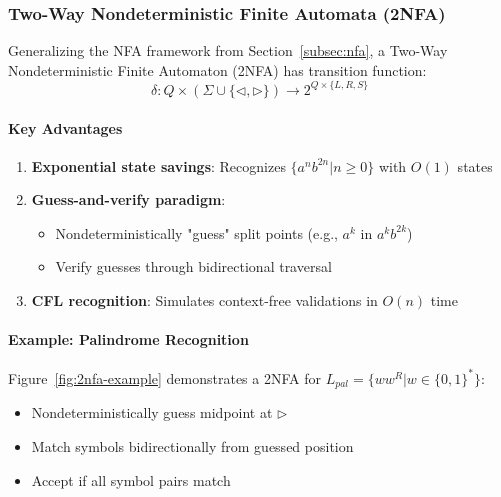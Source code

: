 \subsubsection{Two-Way Nondeterministic Finite Automata (2NFA)}
\label{subsubsec:2nfa}

Generalizing the NFA framework from Section~\ref{subsec:nfa}, a Two-Way Nondeterministic Finite Automaton (2NFA) \cite{hopcroft2006introduction} has transition function:
\[
\delta: Q \times (\Sigma \cup \{\triangleleft, \triangleright\}) \rightarrow 2^{Q \times \{L, R, S\}}
\]

\paragraph{Key Advantages}
\begin{enumerate}
    \item \textbf{Exponential state savings}: Recognizes \( \{a^n b^{2n} | n \geq 0\} \) with \( O(1) \) states \cite{yakaryilmaz2010succinctness}
    \item \textbf{Guess-and-verify paradigm}: 
        \begin{itemize}
            \item Nondeterministically "guess" split points (e.g., \( a^k \) in \( a^k b^{2k} \))
            \item Verify guesses through bidirectional traversal
        \end{itemize}
    \item \textbf{CFL recognition}: Simulates context-free validations in \( O(n) \) time \cite{hromkovic2000probabilistic}
\end{enumerate}

\paragraph{Example: Palindrome Recognition}
Figure~\ref{fig:2nfa-example} demonstrates a 2NFA for \( L_{pal} = \{ww^R | w \in \{0,1\}^*\} \):
\begin{itemize}
    \item Nondeterministically guess midpoint at \( \triangleright \)
    \item Match symbols bidirectionally from guessed position
    \item Accept if all symbol pairs match
\end{itemize}

